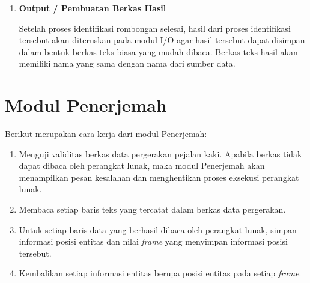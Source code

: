 \begin{enumerate}
    \item \textbf{Output / Pembuatan Berkas Hasil}
    
    Setelah proses identifikasi rombongan selesai, hasil dari proses identifikasi tersebut akan diteruskan pada modul I/O agar hasil tersebut dapat disimpan dalam bentuk berkas teks biasa yang mudah dibaca. Berkas teks hasil akan memiliki nama yang sama dengan nama dari sumber data. 
    
    \iffalse
    
    Sebuah rombongan yang teridentifikasi akan dicatat sebagai satu baris dalam berkas teks yang dihasilkan. Rombongan tersebut akan dicatat dalam bentuk \texttt{<anggota> <frame-mulai> <frame-berakhir>}. Nilai dari \texttt{<anggota>} merupakan nomor identitas dari setiap anggota rombongan yang akan dipisahkan menggunakan koma. Fungsionalitas ini akan diimplementasikan sebagai fungsi \texttt{writeResultToFile}. Fungsionalitas ini akan diimplementasikan menggunakan pustaka standar bawaan C++17.
    
    \fi
\end{enumerate}

\section{Modul Penerjemah}
\label{sec:parser}

Berikut merupakan cara kerja dari modul Penerjemah:

\begin{enumerate}
    \item Menguji validitas berkas data pergerakan pejalan kaki. Apabila berkas tidak dapat dibaca oleh perangkat lunak, maka modul Penerjemah akan menampilkan pesan kesalahan dan menghentikan proses eksekusi perangkat lunak.
    \item Membaca setiap baris teks yang tercatat dalam berkas data pergerakan.
    
    \iffalse 
    
    \cristopher{Kudu jelasin gak sih ko bentuk datanya gimana?} \lionov{gak usah lah, bilang aja pokoknya ini buat nerima input, nanti di ``implementasi'' baru dijelasin setelah ngejelasin datanya kayak apa}
    
    \fi
    
    \item Untuk setiap baris data yang berhasil dibaca oleh perangkat lunak, simpan informasi posisi entitas dan nilai \textit{frame} yang menyimpan informasi posisi tersebut.
    \item Kembalikan setiap informasi entitas berupa posisi entitas pada setiap \textit{frame}.
\end{enumerate}

